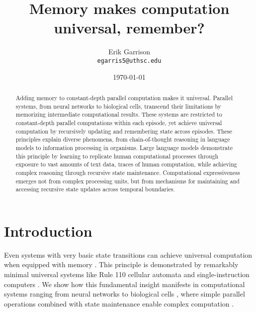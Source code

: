 \documentclass[12pt]{article}
\title{Memory makes computation universal, remember?}
\author{Erik Garrison\\
  \texttt{egarris5@uthsc.edu}\\[1ex]
  }
\date{\today}
\begin{document}
\maketitle

\begin{abstract}
Adding memory to constant-depth parallel computation makes it universal.
Parallel systems, from neural networks to biological cells, transcend their limitations by memorizing intermediate computational results.
These systems are restricted to constant-depth parallel computations within each episode, yet achieve universal computation by recursively updating and remembering state across episodes.
These principles explain diverse phenomena, from chain-of-thought reasoning in language models \cite{merrill2024} to information processing in organisms.
Large language models demonstrate this principle by learning to replicate human computational processes through exposure to vast amounts of text data, traces of human computation, while achieving complex reasoning through recursive state maintenance.
Computational expressiveness emerges not from complex processing units, but from mechanisms for maintaining and accessing recursive state updates across temporal boundaries.
\end{abstract}

\section{Introduction}
Even systems with very basic state transitions can achieve universal computation when equipped with memory \cite{merrill2023parallelism,peng2024limitations}.
This principle is demonstrated by remarkably minimal universal systems like Rule 110 cellular automata \cite{cook2004universality} and single-instruction computers \cite{savage1994space}.
We show how this fundamental insight manifests in computational systems ranging from neural networks to biological cells \cite{wang2023parallel}, where simple parallel operations combined with state maintenance enable complex computation \cite{swamy1983space,bisaz2024memory}.
\end{document}
